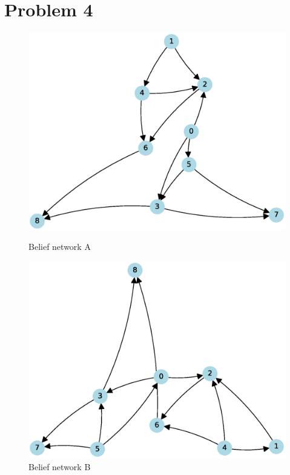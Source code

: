 \documentclass[12pt]{report}
\begin{document}
\section*{Problem 4}


\begin{figure}[H]
    \centering
    \begin{minipage}{0.45\linewidth}
        \centering
        \includegraphics[width=\linewidth]{P4_graphA.eps}
        \caption{Belief network A}
    \end{minipage}%
    \hfill
    \begin{minipage}{0.45\linewidth}
        \centering
        \includegraphics[width=\linewidth]{P4_graphB.eps}
        \caption{Belief network B}
    \end{minipage}
\end{figure}
\end{document}
